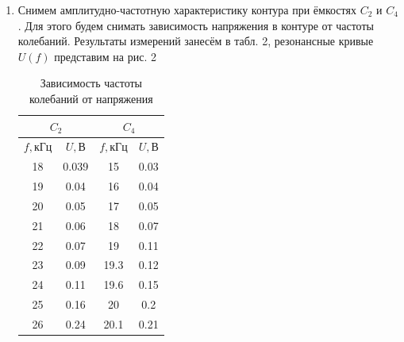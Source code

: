 \documentclass[a4paper]{article}
\begin{document}
\begin{enumerate}
\begin{table}[h]
\begin{tabular}{ |c|c|c|c|c|c|c|c|c|c|c|}
              \end{tabular}
          \end{table}

    \item Снимем амплитудно-частотную характеристику контура при ёмкостях $C_2$ и $C_4$. Для этого будем снимать зависимость напряжения в контуре от частоты колебаний. Результаты измерений занесём в табл. 2, резонансные кривые $U(f)$ представим на рис. 2

          \begin{table}[h]
              \centering
              \begin{center}
                  \caption{Зависимость частоты колебаний от напряжения}
              \end{center}
              \vspace{0.1cm}
              \label{tab:my_label}
              \begin{tabular}{|c|c|c|c|}
                  \hline
                  \multicolumn{2}{|c|}{$C_2$} & \multicolumn{2}{c|}{$C_4$}                     \\
                  \hline
                  $f, $кГц                    & $U, $В                     & $f, $кГц & $U, $В \\
                  \hline
                  18                          & 0.039                      & 15       & 0.03   \\ \hline
                  19                          & 0.04                       & 16       & 0.04   \\ \hline
                  20                          & 0.05                       & 17       & 0.05   \\ \hline
                  21                          & 0.06                       & 18       & 0.07   \\ \hline
                  22                          & 0.07                       & 19       & 0.11   \\ \hline
                  23                          & 0.09                       & 19.3     & 0.12   \\ \hline
                  24                          & 0.11                       & 19.6     & 0.15   \\ \hline
                  25                          & 0.16                       & 20       & 0.2    \\ \hline
                  26                          & 0.24                       & 20.1     & 0.21   \\ \hline

\end{tabular}
\end{table}
\end{enumerate}
\end{document}
